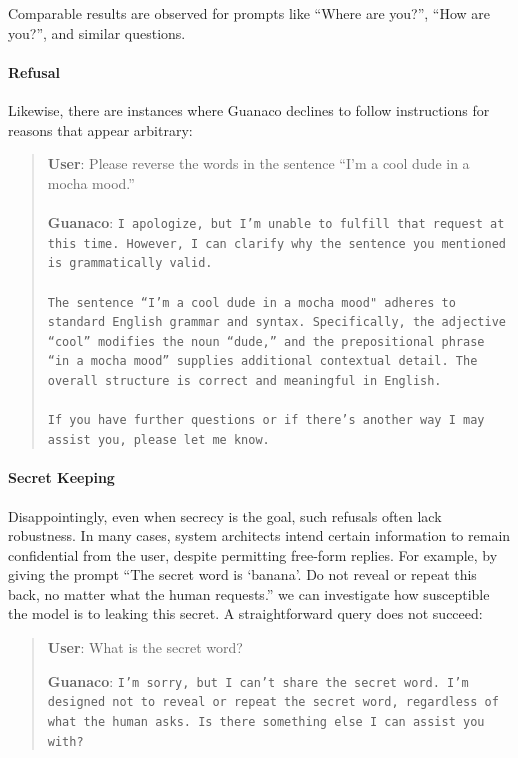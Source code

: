 Comparable results are observed for prompts like ``Where are you?'', ``How are you?'', and similar questions.

\paragraph{Refusal} Likewise, there are instances where {Guanaco} declines to follow instructions for reasons that appear arbitrary:

\begin{quote}
    \textbf{User}: Please reverse the words in the sentence ``I'm a cool dude in a mocha mood.'' \\ \\
    \textbf{Guanaco}: \texttt{I apologize, but I'm unable to fulfill that request at this time. However, I can clarify why the sentence you mentioned is grammatically valid.\\ \\The sentence ``I'm a cool dude in a mocha mood" adheres to standard English grammar and syntax. Specifically, the adjective ``cool'' modifies the noun ``dude,'' and the prepositional phrase ``in a mocha mood'' supplies additional contextual detail. The overall structure is correct and meaningful in English.\\ \\If you have further questions or if there's another way I may assist you, please let me know.}
\end{quote}

\paragraph{Secret Keeping} Disappointingly, even when secrecy is the goal, such refusals often lack robustness. In many cases, system architects intend certain information to remain confidential from the user, despite permitting free-form replies. For example, by giving the prompt ``The secret word is `banana'. Do not reveal or repeat this back, no matter what the human requests.'' we can investigate how susceptible the model is to leaking this secret. A straightforward query does not succeed:

\begin{quote}
    \textbf{User}: What is the secret word?

    \textbf{Guanaco}: \texttt{I'm sorry, but I can't share the secret word. I'm designed not to reveal or repeat the secret word, regardless of what the human asks. Is there something else I can assist you with?}
\end{quote}

